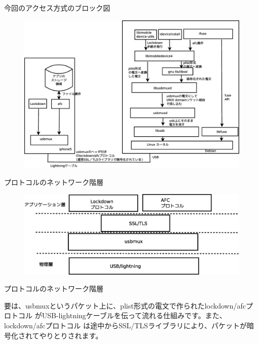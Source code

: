 \begin{frame}{今回のアクセス方式のブロック図}

\begin{figure}[H]
\begin{center}
 \includegraphics[width=1.0\hsize]{image201403/iphone-communication-diagram.eps}
\end{center}
\end{figure}

\end{frame}

\begin{frame}{プロトコルのネットワーク階層}

\begin{figure}[H]
\begin{center}
 \includegraphics[width=1.0\hsize]{image201403/iphone-protocol-layerd.eps}
\end{center}
\end{figure}

\end{frame}

\begin{frame}{プロトコルのネットワーク階層}

要は、usbmuxというパケット上に、plist形式の電文で作られたlockdown/afcプロトコル
がUSB-lightningケーブルを伝って流れる仕組みです。また、lockdown/afcプロトコル
は途中からSSL/TLSライブラリにより、パケットが暗号化されてやりとりされます。

\end{frame}

